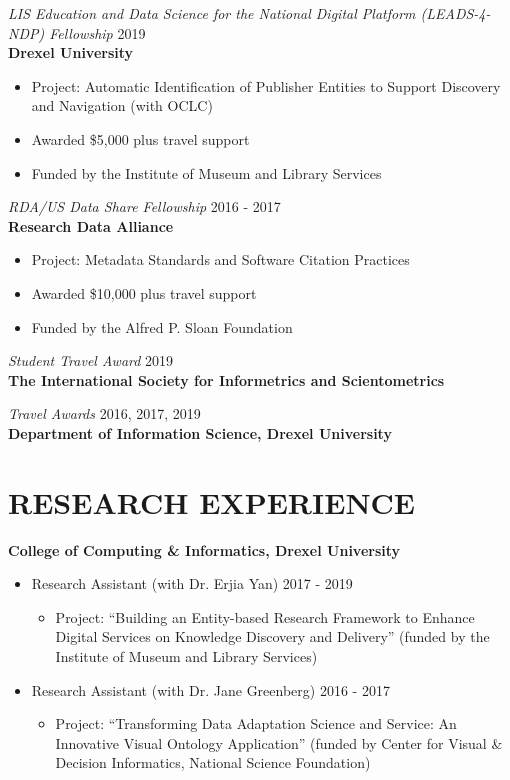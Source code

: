 \documentclass[margin, 10pt]{res} %
\begin{document}
\begin{resume}
{\sl LIS Education and Data Science for the National Digital Platform (LEADS-4-NDP) Fellowship}  \hfill 2019 \\
\textbf{Drexel University}
\begin{itemize}
\item Project: Automatic Identification of Publisher Entities to Support Discovery and Navigation (with OCLC)
\item Awarded \$5,000 plus travel support
\item Funded by the Institute of Museum and Library Services
\end{itemize} 

{\sl RDA/US Data Share Fellowship}  \hfill 2016 - 2017 \\
\textbf{Research Data Alliance}
\begin{itemize}
\item Project: Metadata Standards and Software Citation Practices
\item Awarded \$10,000 plus travel support
\item Funded by the Alfred P. Sloan Foundation
\end{itemize} 

{\sl Student Travel Award} \hfill 2019 \\
\textbf{The International Society for Informetrics and Scientometrics}

{\sl Travel Awards} \hfill 2016, 2017, 2019 \\
\textbf{Department of Information Science, Drexel University}

\section{RESEARCH EXPERIENCE}

\textbf{College of Computing \& Informatics, Drexel University}\\
\begin{itemize}
     \item Research Assistant (with Dr. Erjia Yan) \hfill 2017 - 2019
     \begin{itemize}
     	\item  Project: “Building an Entity-based Research Framework to Enhance Digital Services on Knowledge Discovery and Delivery” (funded by the Institute of Museum and Library Services)
   	\end{itemize}
   	\item Research Assistant (with Dr. Jane Greenberg) \hfill 2016 - 2017
     \begin{itemize}
     	\item  Project: “Transforming Data Adaptation Science and Service: An Innovative Visual Ontology Application” (funded by Center for Visual \& Decision Informatics, National Science Foundation)
   	\end{itemize}
\end{itemize}


\end{resume}
\end{document}
